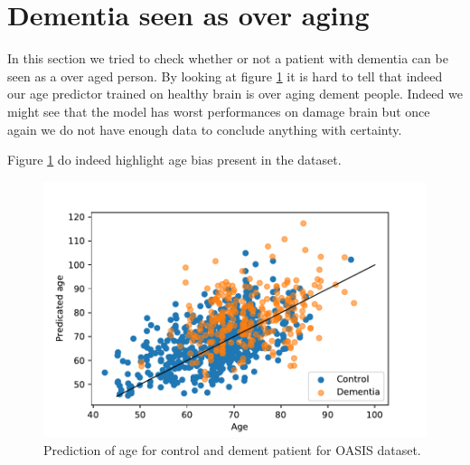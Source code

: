 \section{Dementia seen as over aging}
In this section we tried to check whether or not a patient with dementia can be seen as a over aged person. By looking at figure \ref{fig:dem_vs_control_age_pred} it is hard to tell that indeed our age predictor trained on healthy brain is over aging dement people. Indeed we might see that the model has worst performances on damage brain but once again we do not have enough data to conclude anything with certainty. 

Figure \ref{fig:dem_vs_control_age_pred} do indeed highlight age bias present in the dataset. 
\begin{figure}
 \centering
 \includegraphics[width=.9\linewidth]{figures/Experiements/dem_vs_cont_age_pred.pdf}
 \captionsetup{width=.9\linewidth}
 \caption{Prediction of age for control and dement patient for OASIS dataset.}
 \label{fig:dem_vs_control_age_pred}
\end{figure}
